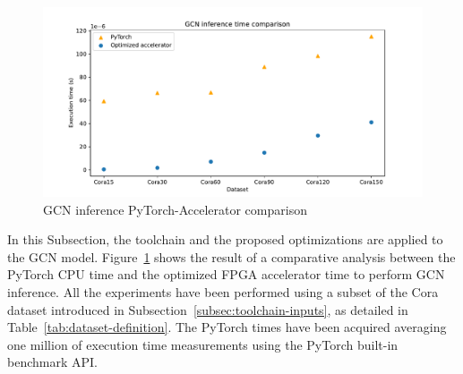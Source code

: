 
\begin{figure}[t!]
    \centering
    \includegraphics[height=0.4\textwidth]{Images/gcn_forward_comparison}
    \caption{GCN inference PyTorch-Accelerator comparison}
    \label{fig:gcn-inference-comparison}
\end{figure}

In this Subsection, the toolchain and the proposed optimizations are applied to the GCN model.
Figure~\ref{fig:gcn-inference-comparison} shows the result of a comparative analysis between the PyTorch CPU time and the optimized FPGA accelerator time to perform GCN inference.
All the experiments have been performed using a subset of the Cora dataset introduced in Subsection~\ref{subsec:toolchain-inputs}, as detailed in Table~\ref{tab:dataset-definition}.
The PyTorch times have been acquired averaging one million of execution time measurements using the PyTorch built-in benchmark API\@.

